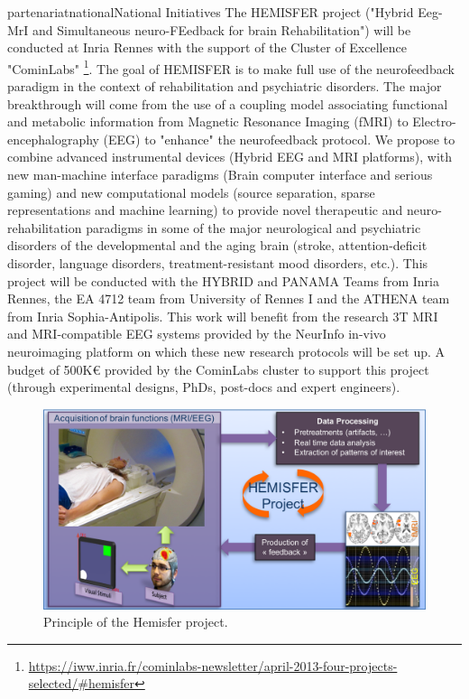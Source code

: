 \documentclass{ra2018}
\begin{document}
\begin{module}{partenariat}{national}{National Initiatives}
        The HEMISFER project ("Hybrid Eeg-MrI and Simultaneous neuro-FEedback for brain
        Rehabilitation") will be conducted at Inria Rennes with the support of the
        Cluster of Excellence "CominLabs"
        \footnote{\url{https://iww.inria.fr/cominlabs-newsletter/april-2013-four-projects-selected/\#hemisfer}}.  
         The goal of HEMISFER is to make full use of the neurofeedback paradigm in
        the context of rehabilitation and psychiatric disorders. The major breakthrough
        will come from the use of a coupling model associating functional and metabolic
        information from Magnetic Resonance Imaging (fMRI) to Electro-encephalography
        (EEG) to "enhance" the neurofeedback protocol. We propose to combine advanced
        instrumental devices (Hybrid EEG and MRI platforms), with new man-machine
        interface paradigms (Brain computer interface and serious gaming) and new
        computational models (source separation, sparse representations and machine
        learning) to provide novel therapeutic and neuro-rehabilitation paradigms in
        some of the major neurological and psychiatric disorders of the developmental
        and the aging brain (stroke, attention-deficit disorder, language disorders,
        treatment-resistant mood disorders, etc.). This project will be conducted with
        the HYBRID and PANAMA Teams from Inria Rennes, the EA 4712 team from University
        of Rennes I and the ATHENA team from Inria Sophia-Antipolis. This work will
        benefit from the research 3T MRI and MRI-compatible EEG systems provided by the
        NeurInfo in-vivo neuroimaging platform on which these new research protocols
        will be set up. A budget of 500K€ provided by the CominLabs cluster
        to support this project (through experimental designs, PhDs, post-docs and expert engineers).

        \begin{figure}[htbp]
          \centerline{
            \includegraphics[width=\textwidth]{IMG/Hemisfer_Principle.png}
          }
          \caption{Principle of the Hemisfer project.}
          \label{fig-hemisfer}
        \end{figure}
        

\end{module}
\end{document}
